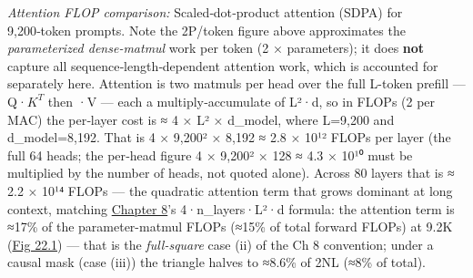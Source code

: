 \emph{Attention FLOP comparison:} Scaled‑dot‑product attention (SDPA)
for 9,200‑token prompts. Note the 2P/token figure above approximates the
\emph{parameterized dense‑matmul} work per token (2 × parameters); it
does \textbf{not} capture all sequence‑length‑dependent attention work,
which is accounted for separately here. Attention is two matmuls per
head over the full L-token prefill --- Q·\(K^{T}\) then ·V --- each a
multiply‑accumulate of L²·d, so in FLOPs (2 per MAC) the per‑layer cost
is ≈ 4 × L² × d\_model, where L=9,200 and d\_model=8,192. That is 4 ×
9,200² × 8,192 ≈ 2.8 × 10¹² FLOPs per layer (the full 64 heads; the
per‑head figure 4 × 9,200² × 128 ≈ 4.3 × 10¹⁰ must be multiplied by the
number of heads, not quoted alone). Across 80 layers that is ≈ 2.2 ×
10¹⁴ FLOPs --- the quadratic attention term that grows dominant at long
context, matching \hyperref[chap:8]{Chapter 8}'s 4·n\_layers·L²·d formula: the attention
term is ≈17\% of the parameter-matmul FLOPs (≈15\% of total forward
FLOPs) at 9.2K (\hyperref[fig:22.1]{Fig 22.1}) --- that is the \emph{full-square} case (ii)
of the Ch 8 convention; under a causal mask (case (iii)) the triangle
halves to ≈8.6\% of 2NL (≈8\% of total).

